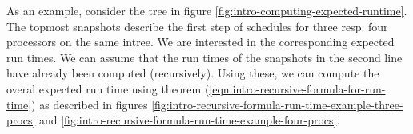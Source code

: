 

As an example, consider the tree in figure \ref{fig:intro-computing-expected-runtime}. The topmost snapshots describe the first step of schedules for three resp. four processors on the same intree. We are interested in the corresponding expected run times. We can assume that the run times of the snapshots in the second line have already been computed (recursively). Using these, we can compute the overal expected run time using theorem (\ref{eqn:intro-recursive-formula-for-run-time}) as described in figures \ref{fig:intro-recursive-formula-run-time-example-three-procs} and \ref{fig:intro-recursive-formula-run-time-example-four-procs}. 

